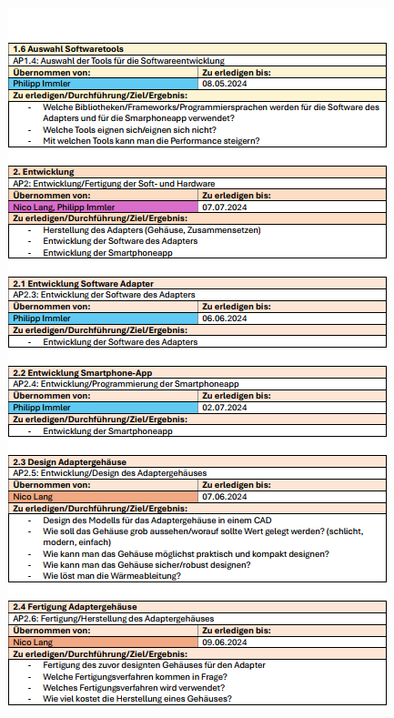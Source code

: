 \documentclass[11pt, twoside]{article}
\begin{document}
\newpage
\begin{figure}[H]  
    \centering
    \includegraphics[height=\textheight]{ap_2.png}
\end{figure}
\newpage
\end{document}
